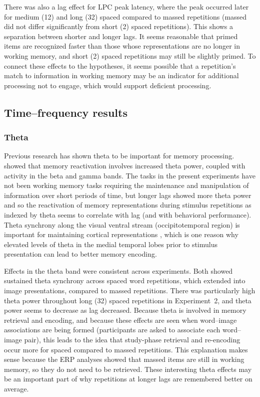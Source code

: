 There was also a lag effect for LPC peak latency, where the peak occurred later for medium (12) and long (32) spaced compared to massed repetitions (massed did not differ significantly from short (2) spaced repetitions).  This shows a separation between shorter and longer lags.  It seems reasonable that primed items are recognized faster than those whose representations are no longer in working memory, and short (2) spaced repetitions may still be slightly primed.  To connect these effects to the hypotheses, it seems possible that a repetition's match to information in working memory may be an indicator for additional processing not to engage, which would support deficient processing.

\subsection{Time--frequency results}

\subsubsection{Theta}

Previous research has shown theta to be important for memory processing.
 showed that memory reactivation involves increased theta power, coupled with activity in the beta and gamma bands.
The tasks in the present experiments have not been working memory tasks requiring the maintenance and manipulation of information over short periods of time, but longer lags showed more theta power and so the reactivation of memory representations during stimulus repetitions as indexed by theta seems to correlate with lag (and with behavioral performance).
Theta synchrony along the visual ventral stream (occipitotemporal region) is important for maintaining cortical representations \cite{DuzeEtal2010}, which is one reason why elevated levels of theta in the medial temporal lobes prior to stimulus presentation can lead to better memory encoding.

Effects in the theta band were consistent across experiments.  Both showed sustained theta synchrony across spaced word repetitions, which extended into image presentations, compared to massed repetitions.  There was particularly high theta power throughout long (32) spaced repetitions in Experiment~2, and theta power seems to decrease as lag decreased.
Because theta is involved in memory retrieval and encoding, and because these effects are seen when word--image associations are being formed (participants are asked to associate each word--image pair), this leads to the idea that study-phase retrieval and re-encoding occur more for spaced compared to massed repetitions.  This explanation makes sense because the ERP analyses showed that massed items are still in working memory, so they do not need to be retrieved.
These interesting theta effects may be an important part of why repetitions at longer lags are remembered better on average.

